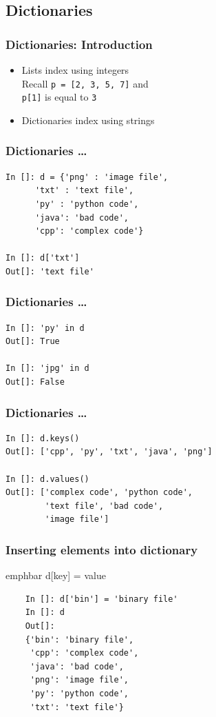 \documentclass[14pt,compress]{beamer}
\newcommand{\emphbar}[1]
{\begin{beamercolorbox}[rounded=true]{emphbar} 
      {#1}
 \end{beamercolorbox}
}
\newcounter{time}
\newcommand{\inctime}[1]{\addtocounter{time}{#1}{\tiny \thetime\ m}}
\newcommand{\typ}[1]{\lstinline{#1}}
\begin{document}
\subsection{Dictionaries}
\begin{frame}[fragile]
  \frametitle{Dictionaries: Introduction}
  \begin{itemize}
    \item Lists index using integers\\
Recall \typ{p = [2, 3, 5, 7]} and\\
\typ{p[1]} is equal to \typ{3}
    \item Dictionaries index using strings
  \end{itemize}
\end{frame}

\begin{frame}[fragile]
  \frametitle{Dictionaries \ldots}
  \begin{lstlisting}
In []: d = {'png' : 'image file',
      'txt' : 'text file', 
      'py' : 'python code',
      'java': 'bad code', 
      'cpp': 'complex code'}

In []: d['txt']
Out[]: 'text file'
  \end{lstlisting}
\end{frame}

\begin{frame}[fragile]
  \frametitle{Dictionaries \ldots}
  \begin{lstlisting}
In []: 'py' in d
Out[]: True

In []: 'jpg' in d
Out[]: False
  \end{lstlisting}
\end{frame}

\begin{frame}[fragile]
  \frametitle{Dictionaries \ldots}
  \begin{small}
    \begin{lstlisting}
In []: d.keys()
Out[]: ['cpp', 'py', 'txt', 'java', 'png']

In []: d.values()
Out[]: ['complex code', 'python code',
        'text file', 'bad code', 
        'image file']
    \end{lstlisting}
  \end{small}
  \inctime{10}
\end{frame}

\begin{frame}[fragile]
  \frametitle{Inserting elements into dictionary}
  \emphbar{\alert{d[key] = value}}
  \begin{lstlisting}
    In []: d['bin'] = 'binary file'
    In []: d
    Out[]: 
    {'bin': 'binary file',
     'cpp': 'complex code',
     'java': 'bad code',
     'png': 'image file',
     'py': 'python code',
     'txt': 'text file'}
  \end{lstlisting}
\end{frame}
\end{document}
